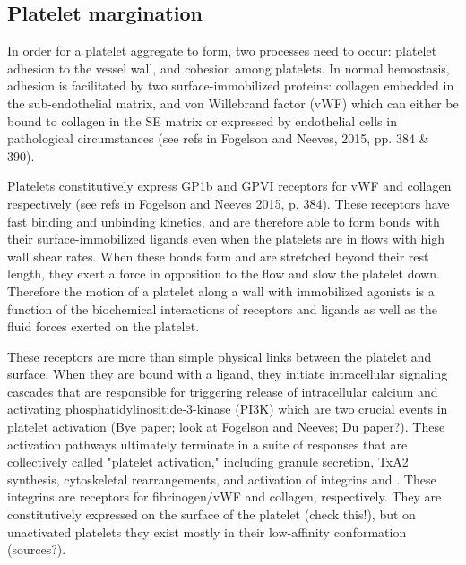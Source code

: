 \subsection{Platelet margination}
\label{sec:platelet-margination}

In order for a platelet aggregate to form, two processes need to
occur: platelet adhesion to the vessel wall, and cohesion among
platelets. In normal hemostasis, adhesion is facilitated by two
surface-immobilized proteins: collagen embedded in the sub-endothelial
matrix, and von Willebrand factor (vWF) which can either be bound to
collagen in the SE matrix or expressed by endothelial cells in
pathological circumstances (see refs in Fogelson and Neeves, 2015,
pp. 384 \& 390).
		
Platelets constitutively express GP1b and GPVI receptors for vWF and
collagen respectively (see refs in Fogelson and Neeves 2015,
p. 384). These receptors have fast binding and unbinding kinetics, and
are therefore able to form bonds with their surface-immobilized
ligands even when the platelets are in flows with high wall shear
rates. When these bonds form and are stretched beyond their rest
length, they exert a force in opposition to the flow and slow the
platelet down. Therefore the motion of a platelet along a wall with
immobilized agonists is a function of the biochemical interactions of
receptors and ligands as well as the fluid forces exerted on the
platelet.
		
These receptors are more than simple physical links between the
platelet and surface. When they are bound with a ligand, they initiate
intracellular signaling cascades that are responsible for triggering
release of intracellular calcium and activating
phosphatidylinositide-3-kinase (PI3K) which are two crucial events in
platelet activation (Bye paper; look at Fogelson and Neeves; Du
paper?). These activation pathways ultimately terminate in a suite of
responses that are collectively called "platelet activation,"
including granule secretion, TxA2 synthesis, cytoskeletal
rearrangements, and activation of integrins  and
. These integrins are receptors for fibrinogen/vWF
and collagen, respectively. They are constitutively expressed on the
surface of the platelet (check this!), but on unactivated platelets
they exist mostly in their low-affinity conformation (sources?).
		
